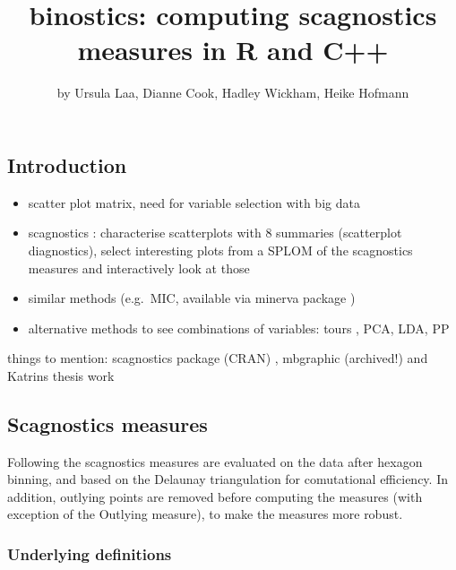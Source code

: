 \title{binostics: computing scagnostics measures in R and C++}
\author{by Ursula Laa, Dianne Cook, Hadley Wickham, Heike Hofmann}

\maketitle


\hypertarget{introduction}{%
\subsection{Introduction}\label{introduction}}

\begin{itemize}
\tightlist
\item
  scatter plot matrix, need for variable selection with big data
\item
  scagnostics \citep[\citet{WW08}]{scag}: characterise scatterplots with
  8 summaries (scatterplot diagnostics), select interesting plots from a
  SPLOM of the scagnostics measures and interactively look at those
\item
  similar methods (e.g.~MIC\citep{Reshef1518}, available via minerva
  package \citep{minerva})
\item
  alternative methods to see combinations of variables: tours
  \citep[\citet{tourr}]{As85}, PCA, LDA, PP \citep{f87}
\end{itemize}

things to mention: scagnostics package (CRAN) \citep{LWscagR}, mbgraphic
\citep{mbgraphic} (archived!) and Katrins thesis work \citep{Grimm2016}

\hypertarget{scagnostics-measures}{%
\subsection{Scagnostics measures}\label{scagnostics-measures}}

Following \citet{scag} the scagnostics measures are evaluated on the
data after hexagon binning, and based on the Delaunay triangulation for
comutational efficiency. In addition, outlying points are removed before
computing the measures (with exception of the Outlying measure), to make
the measures more robust.

\hypertarget{underlying-definitions}{%
\subsubsection{Underlying definitions}\label{underlying-definitions}}

